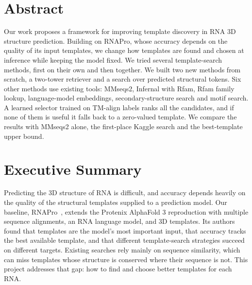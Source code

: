 \documentclass{FastFyp}
\begin{document}
\section*{Abstract}
Our work proposes a framework for improving template discovery in RNA 3D structure prediction. Building on RNAPro, whose accuracy depends on the quality of its input templates, we change how templates are found and chosen at inference while keeping the model fixed. We tried several template-search methods, first on their own and then together. We built two new methods from scratch, a two-tower retriever and a search over predicted structural tokens. Six other methods use existing tools: MMseqs2, Infernal with Rfam, Rfam family lookup, language-model embeddings, secondary-structure search and motif search. A learned selector trained on TM-align labels ranks all the candidates, and if none of them is useful it falls back to a zero-valued template. We compare the results with MMseqs2 alone, the first-place Kaggle search and the best-template upper bound.
\pagebreak


\section*{Executive Summary}

Predicting the 3D structure of RNA is difficult, and accuracy depends heavily on the quality of the structural templates supplied to a prediction model. Our baseline, RNAPro~\cite{leerna}, extends the Protenix AlphaFold 3 reproduction with multiple sequence alignments, an RNA language model, and 3D templates. Its authors found that templates are the model's most important input, that accuracy tracks the best available template, and that different template-search strategies succeed on different targets. Existing searches rely mainly on sequence similarity, which can miss templates whose structure is conserved where their sequence is not. This project addresses that gap: how to find and choose better templates for each RNA.
\end{document}
